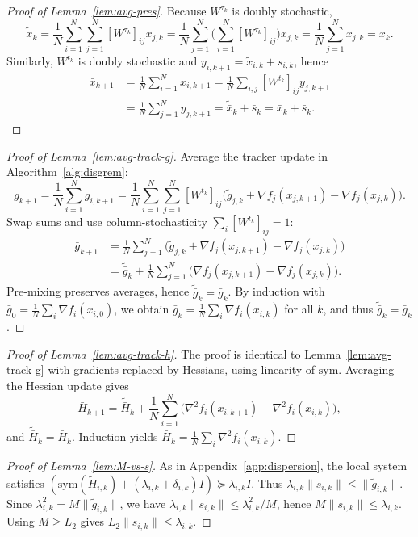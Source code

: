 \documentclass[10pt,twocolumn,letterpaper]{article}
\theoremstyle{compact}
\theoremstyle{compactremark}
\begin{document}
\begin{proof}[Proof of Lemma~\ref{lem:avg-pres}]
Because $W^{\tau_k}$ is doubly stochastic,
\[
\tilde{\bar x}_k=\frac1N\sum_{i=1}^N\sum_{j=1}^N [W^{\tau_k}]_{ij}x_{j,k}
=\frac1N\sum_{j=1}^N\Big(\sum_{i=1}^N [W^{\tau_k}]_{ij}\Big)x_{j,k}
=\frac1N\sum_{j=1}^N x_{j,k}=\bar x_k.
\]
Similarly, $W^{t_k}$ is doubly stochastic and $y_{i,k+1}=\tilde x_{i,k}+s_{i,k}$, hence
\begin{align*}
\bar x_{k+1}
&=\tfrac1N\textstyle\sum_{i=1}^N x_{i,k+1}
=\tfrac1N\textstyle\sum_{i,j} [W^{t_k}]_{ij}y_{j,k+1}\\
&=\tfrac1N\textstyle\sum_{j=1}^N y_{j,k+1}
=\tilde{\bar x}_k+\bar s_k=\bar x_k+\bar s_k.
\end{align*}
\end{proof}

\begin{proof}[Proof of Lemma~\ref{lem:avg-track-g}]
Average the tracker update in Algorithm~\ref{alg:disgrem}:
\[
\bar g_{k+1}
=\frac1N\sum_{i=1}^N g_{i,k+1}
=\frac1N\sum_{i=1}^N\sum_{j=1}^N [W^{t_k}]_{ij}\Big(\tilde g_{j,k}+\nabla f_j(x_{j,k+1})-\nabla f_j(x_{j,k})\Big).
\]
Swap sums and use column-stochasticity $\sum_i [W^{t_k}]_{ij}=1$:
\begin{align*}
\bar g_{k+1}&=\tfrac1N\textstyle\sum_{j=1}^N\!\Big(\tilde g_{j,k}+\nabla f_j(x_{j,k+1})-\nabla f_j(x_{j,k})\Big)\\
&=\tilde{\bar g}_k+\tfrac1N\textstyle\sum_{j=1}^N\!\big(\nabla f_j(x_{j,k+1})-\nabla f_j(x_{j,k})\big).
\end{align*}
Pre-mixing preserves averages, hence $\tilde{\bar g}_k=\bar g_k$.
By induction with $\bar g_0=\frac1N\sum_i \nabla f_i(x_{i,0})$, we obtain
$\bar g_k=\frac1N\sum_i \nabla f_i(x_{i,k})$ for all $k$, and thus $\tilde{\bar g}_k=\bar g_k$.
\end{proof}

\begin{proof}[Proof of Lemma~\ref{lem:avg-track-h}]
The proof is identical to Lemma~\ref{lem:avg-track-g} with gradients replaced by Hessians, using linearity of $\mathrm{sym}$.
Averaging the Hessian update gives
\[
\bar H_{k+1}=\tilde{\bar H}_k+\frac1N\sum_{i=1}^N\big(\nabla^2 f_i(x_{i,k+1})-\nabla^2 f_i(x_{i,k})\big),
\]
and $\tilde{\bar H}_k=\bar H_k$. Induction yields $\bar H_k=\frac1N\sum_i \nabla^2 f_i(x_{i,k})$.
\end{proof}

\begin{proof}[Proof of Lemma~\ref{lem:M-vs-s}]
As in Appendix~\ref{app:dispersion}, the local system satisfies
$(\mathrm{sym}(\tilde H_{i,k})+(\lambda_{i,k}+\delta_{i,k})I)\succeq \lambda_{i,k}I$.
Thus $\lambda_{i,k}\|s_{i,k}\|\le \|\tilde g_{i,k}\|$.
Since $\lambda_{i,k}^2=M\|\tilde g_{i,k}\|$, we have $\lambda_{i,k}\|s_{i,k}\|\le \lambda_{i,k}^2/M$,
hence $M\|s_{i,k}\|\le \lambda_{i,k}$. Using $M\ge L_2$ gives $L_2\|s_{i,k}\|\le\lambda_{i,k}$.
\end{proof}
\end{document}
